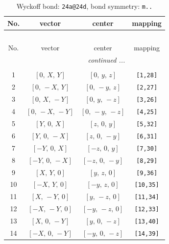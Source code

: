 \documentclass[fleqn,8pt]{jsarticle}
\begin{document}
\begin{longtable}{cccc}
\caption{Wyckoff bond: {\tt 24a@24d}, bond symmetry: {\tt m..}}
 \\
 \hline \hline
No. & vector & center & mapping \\ \hline \endfirsthead

\multicolumn{3}{l}{\tablename\ \thetable{}} \\
 \hline \hline
No. & vector & center & mapping \\ \hline \endhead

 \hline \hline
\multicolumn{3}{r}{\footnotesize\it continued ...} \\ \endfoot

 \hline \hline
\multicolumn{3}{r}{} \\ \endlastfoot

1 & $\left[ 0,\, X,\, Y \right]$ & $\left[ 0,\, y,\, z \right]$ & {\tt [1,28]} \\ \hline
2 & $\left[ 0,\, - X,\, Y \right]$ & $\left[ 0,\, - y,\, z \right]$ & {\tt [2,27]} \\ \hline
3 & $\left[ 0,\, X,\, - Y \right]$ & $\left[ 0,\, y,\, - z \right]$ & {\tt [3,26]} \\ \hline
4 & $\left[ 0,\, - X,\, - Y \right]$ & $\left[ 0,\, - y,\, - z \right]$ & {\tt [4,25]} \\ \hline
5 & $\left[ Y,\, 0,\, X \right]$ & $\left[ z,\, 0,\, y \right]$ & {\tt [5,32]} \\ \hline
6 & $\left[ Y,\, 0,\, - X \right]$ & $\left[ z,\, 0,\, - y \right]$ & {\tt [6,31]} \\ \hline
7 & $\left[ - Y,\, 0,\, X \right]$ & $\left[ - z,\, 0,\, y \right]$ & {\tt [7,30]} \\ \hline
8 & $\left[ - Y,\, 0,\, - X \right]$ & $\left[ - z,\, 0,\, - y \right]$ & {\tt [8,29]} \\ \hline
9 & $\left[ X,\, Y,\, 0 \right]$ & $\left[ y,\, z,\, 0 \right]$ & {\tt [9,36]} \\ \hline
10 & $\left[ - X,\, Y,\, 0 \right]$ & $\left[ - y,\, z,\, 0 \right]$ & {\tt [10,35]} \\ \hline
11 & $\left[ X,\, - Y,\, 0 \right]$ & $\left[ y,\, - z,\, 0 \right]$ & {\tt [11,34]} \\ \hline
12 & $\left[ - X,\, - Y,\, 0 \right]$ & $\left[ - y,\, - z,\, 0 \right]$ & {\tt [12,33]} \\ \hline
13 & $\left[ X,\, 0,\, - Y \right]$ & $\left[ y,\, 0,\, - z \right]$ & {\tt [13,40]} \\ \hline
14 & $\left[ - X,\, 0,\, - Y \right]$ & $\left[ - y,\, 0,\, - z \right]$ & {\tt [14,39]} \\ \hline

\end{longtable}
\end{document}
